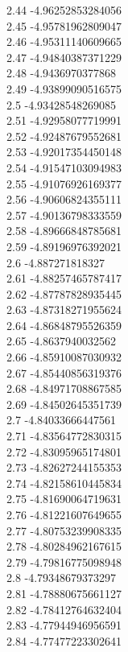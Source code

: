 {2.44	-4.96252853284056\\
2.45	-4.95781962809047\\
2.46	-4.95311140609665\\
2.47	-4.94840387371229\\
2.48	-4.9436970377868\\
2.49	-4.93899090516575\\
2.5	-4.93428548269085\\
2.51	-4.92958077719991\\
2.52	-4.92487679552681\\
2.53	-4.92017354450148\\
2.54	-4.91547103094983\\
2.55	-4.91076926169377\\
2.56	-4.90606824355111\\
2.57	-4.90136798333559\\
2.58	-4.89666848785681\\
2.59	-4.89196976392021\\
2.6	-4.887271818327\\
2.61	-4.88257465787417\\
2.62	-4.87787828935445\\
2.63	-4.87318271955624\\
2.64	-4.86848795526359\\
2.65	-4.8637940032562\\
2.66	-4.85910087030932\\
2.67	-4.85440856319376\\
2.68	-4.84971708867585\\
2.69	-4.84502645351739\\
2.7	-4.84033666447561\\
2.71	-4.83564772830315\\
2.72	-4.83095965174801\\
2.73	-4.82627244155353\\
2.74	-4.82158610445834\\
2.75	-4.81690064719631\\
2.76	-4.81221607649655\\
2.77	-4.80753239908335\\
2.78	-4.80284962167615\\
2.79	-4.79816775098948\\
2.8	-4.79348679373297\\
2.81	-4.78880675661127\\
2.82	-4.78412764632404\\
2.83	-4.77944946956591\\
2.84	-4.77477223302641\\
}
